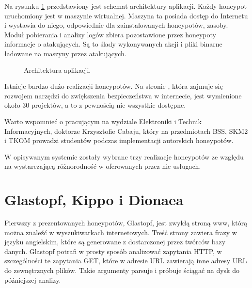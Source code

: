 \documentclass[runningheads,a4paper]{llncs}
\begin{document}
Na rysunku \ref{fig:architektura_fig} przedstawiony jest schemat architektury aplikacji. Każdy honeypot uruchomiony jest w maszynie wirtualnej. Maszyna ta posiada dostęp do Internetu i wystawia do niego, odpowiednie dla zainstalowanych honeypotów, zasoby. Moduł pobierania i analizy logów zbiera pozostawione przez honeypoty informacje o atakujących. Są to ślady wykonywanych akcji i pliki binarne ładowane na maszyny przez atakujących.

\begin{figure}
        \centering
        \caption{Architektura aplikacji.}
        \label{fig:architektura_fig}
\end{figure}

Istnieje bardzo dużo realizacji honeypotów. Na stronie \cite{honeynet_project}, która zajmuje się rozwojem narzędzi do zwiększenia bezpieczeństwa w internecie, jest wymienione około 30 projektów, a to z pewnością nie wszystkie dostępne.

Warto wspomnieć o pracującym na wydziale Elektroniki i Technik Informacyjnych, doktorze Krzysztofie Cabaju, który na przedmiotach BSS, SKM2 i TKOM prowadzi studentów podczas implementacji autorskich honeypotów.

W opisywanym systemie zostały wybrane trzy realizacje honeypotów ze względu na wystarczającą różnorodność w oferowanych przez nie usługach.

\section{Glastopf, Kippo i Dionaea}

Pierwszy z prezentowanych honeypotów, Glastopf, jest zwykłą stroną www, którą można znaleźć w wyszukiwarkach internetowych. Treść strony zawiera frazy w języku angielskim, które są generowane z dostarczonej przez twórców bazy danych. Glastopf potrafi w prosty sposób analizować zapytania HTTP, w szczególności te zapytania GET, które w adresie URL zawierają inne adresy URL do zewnętrznych plików. Takie argumenty parsuje i próbuje ściągać na dysk do późniejszej analizy.
\end{document}
